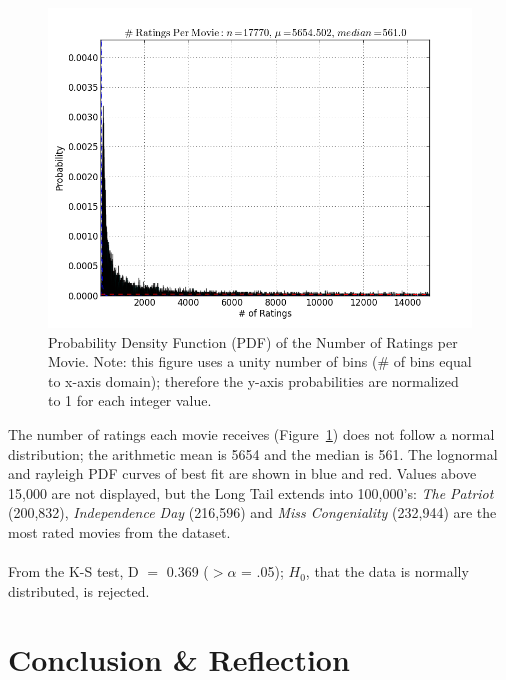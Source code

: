 \documentclass{acmtog}
\begin{document}
\begin{figure}
\centerline{\includegraphics[scale=.45]{num_ratings_per_movie.png}}
\caption{Probability Density Function (PDF) of the Number of Ratings per Movie. Note: this figure uses a unity number of bins (\# of bins equal to x-axis domain); therefore the y-axis probabilities are normalized to 1 for each integer value.}
\label{fig:six}
\end{figure}

The number of ratings each movie receives (Figure~\ref{fig:six}) does not follow a normal distribution; the arithmetic mean is 5654 and the median is 561. The lognormal and rayleigh PDF curves of best fit are shown in blue and red. Values above 15,000 are not displayed, but the Long Tail extends into 100,000's: \textit{The Patriot} (200,832), \textit{Independence Day} (216,596) and \textit{Miss Congeniality} (232,944) are the most rated movies from the dataset.
\\
\\
From the K-S test, D $=$ 0.369 ($>\alpha$ = .05); $H_0$, that the data is normally distributed, is rejected.
\medskip
\section{Conclusion \& Reflection}
\end{document}
